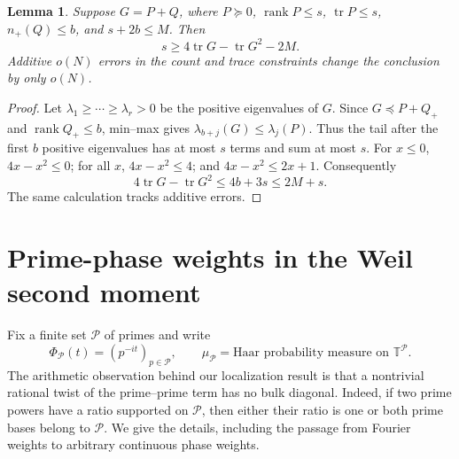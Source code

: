 \documentclass[11pt,letterpaper]{article}
\newtheorem{lemma}[theorem]{Lemma}
\theoremstyle{definition}
\theoremstyle{remark}
\DeclareMathOperator{\rank}{rank}
\DeclareMathOperator{\tr}{tr}
\newcommand{\1}{\mathbf 1}
\begin{document}
\begin{lemma}\label{p03:lem:rank-basic}Suppose $G=P+Q$, where $P\succeq0$, $\rank P\le s$,
$\tr P\le s$, $n_+(Q)\le b$, and $s+2b\le M$. Then
\[
 s\ge 4\tr G-\tr G^2-2M.
\]
Additive $o(N)$ errors in the count and trace constraints change
the conclusion by only $o(N)$.
\end{lemma}
\begin{proof}
Let $\lambda_1\ge\cdots\ge\lambda_r>0$ be the positive
eigenvalues of $G$. Since $G\preceq P+Q_+$ and
$\rank Q_+\le b$, min--max gives
$\lambda_{b+j}(G)\le\lambda_j(P)$. Thus the tail after the first
$b$ positive eigenvalues has at most $s$ terms and sum at most $s$.
For $x\le0$, $4x-x^2\le0$; for all $x$, $4x-x^2\le4$;
and $4x-x^2\le2x+1$. Consequently
\[
 4\tr G-\tr G^2\le4b+3s\le2M+s.
\]
The same calculation tracks additive errors.
\end{proof}





\section{Prime-phase weights in the Weil second moment}\label{p03:sec:phase-arithmetic}

Fix a finite set $\mathcal P$ of primes and write
\[
 \Phi_{\mathcal P}(t)=(p^{-it})_{p\in\mathcal P},\qquad
 \mu_{\mathcal P}=\text{Haar probability measure on }\mathbb T^{\mathcal P}.
\]
The arithmetic observation behind our localization result is that a
nontrivial rational twist of the prime--prime term has no bulk diagonal.
Indeed, if two prime powers have a ratio supported on $\mathcal P$, then
either their ratio is one or both prime bases belong to $\mathcal P$.
We give the details, including the passage from Fourier weights to
arbitrary continuous phase weights.
\end{document}
